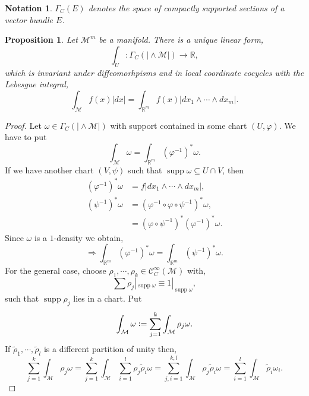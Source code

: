 \documentclass[8pt]{article}
\newtheorem{proposition}{Proposition}[section]
\newtheorem{notation}{Notation}[section]
\DeclareMathOperator{\supp}{supp}
\newcommand{\defeq}{\vcentcolon=}
\newcommand{\R}[0]{\mathbb{R}}
\newcommand{\M}[0]{\mathcal{M}}
\newcommand{\cinf}[0]{\mathcal{C}^\infty}
\begin{document}
  \begin{notation}
    $\Gamma_C(E)$ denotes the space of compactly supported sections of a vector bundle $E$.
  \end{notation}

\begin{proposition}
  Let $\M^m$ be a manifold. There is a unique linear form, 
  \begin{equation*}
    \int_{U}:\Gamma_C(\vert\wedge\M\vert) \to \R,
  \end{equation*}
  which is invariant under diffeomorhpisms and in local coordinate cocycles with the Lebesgue integral,
  \begin{equation*}
    \int_\M f(x)\vert dx\vert = \int_{\R^m} f(x)\vert dx_1\wedge\cdots\wedge dx_m\vert. 
  \end{equation*}
\end{proposition}
\begin{proof}
  Let $\omega\in\Gamma_C(\vert\wedge\M\vert)$ with support contained in some chart $(U,\varphi)$. We have to put 
  \begin{equation*}
    \int_\M\omega = \int_{\R^m}(\varphi^{-1})^*\omega.
  \end{equation*}
  If we have another chart $(V,\psi)$ such that $\supp \omega\subseteq U\cap V$, then 
  \begin{align*}
    (\varphi^{-1})^*\omega &= f\vert dx_1\wedge\cdots\wedge dx_m\vert,\\
    (\psi^{-1})^*\omega & = (\varphi^{-1}\circ\varphi\circ\psi^{-1})^*\omega,\\
     & = (\varphi\circ\psi^{-1})^*(\varphi^{-1})^*\omega.
  \end{align*}
  Since $\omega$ is a $1$-density we obtain,
  \begin{equation*}
    \Rightarrow \int_{\R^m}(\varphi^{-1})^*\omega = \int_{\R^m}(\psi^{-1})^*\omega.
  \end{equation*}
  For the general case, choose $\rho_1,\cdots,\rho_k\in\cinf_C(\M)$ with,
  \begin{equation*}
    \sum \rho_j|_{\supp\omega} \equiv 1|_{\supp\omega},
  \end{equation*}
  such that $\supp\rho_j$ lies in a chart. Put 
  \begin{equation*}
    \int_\M\omega \defeq \sum_{j=1}^k\int_\M\rho_j\omega.
  \end{equation*}
  If $\tilde{\rho}_1,\cdots,\tilde{\rho}_l$ is a different partition of unity then,
  \begin{equation*}
    \sum_{j=1}^k\int_\M\rho_j\omega = \sum_{j=1}^k\int_\M\sum_{i=1}^l\rho_j\tilde{\rho}_i\omega = \sum_{j,i=1}^{k,l}\int_\M\rho_j\tilde{\rho}_i\omega = \sum_{i=1}^l\int_\M\tilde{\rho}_i\omega_i.
  \end{equation*}
\end{proof}
\end{document}
